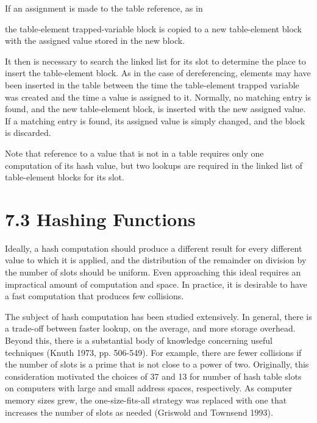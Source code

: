 If an assignment is made to the table reference, as in


\noindent the table-element trapped-variable block is copied to a new
table-element block with the assigned value stored in the new block.

It then is necessary to search the linked list for its slot to %
determine the place to insert the table-element block. As in the case
of dereferencing, elements may have been inserted in the table between
the time the table-element trapped variable was created and the time a
value is assigned to it. Normally, no matching entry is found, and the
new table-element
block, is inserted with the new assigned value.  If a matching entry
is found, its assigned value is simply changed, and the block is
discarded.

Note that reference to a value that is not in a table requires only
one computation of its hash value, but two lookups are required in the
linked list of table-element blocks for its slot.


\section[7.3 Hashing Functions]{7.3 Hashing Functions}

Ideally, a hash computation should produce a different result for
every different value to which it is applied, and the distribution of
the remainder on division by the number of slots should be
uniform. Even approaching this ideal requires an impractical amount of
computation and space. In practice, it is desirable to have a fast
computation that produces few collisions.

The subject of hash computation has been studied extensively.  In
general, there is a trade-off between faster lookup, on the average,
and more storage overhead. Beyond this, there is a substantial body of
knowledge concerning useful techniques (Knuth 1973, pp. 506-549). For
example, there are fewer collisions if the number of slots is a prime
that is not close to a power of two. Originally, this consideration
motivated the choices of 37 and 13 for number of hash table slots on
computers with large and small address spaces, respectively. As
computer memory sizes grew, the one-size-fits-all strategy was
replaced with one that increases the number of slots as needed
(Griswold and Townsend 1993).

